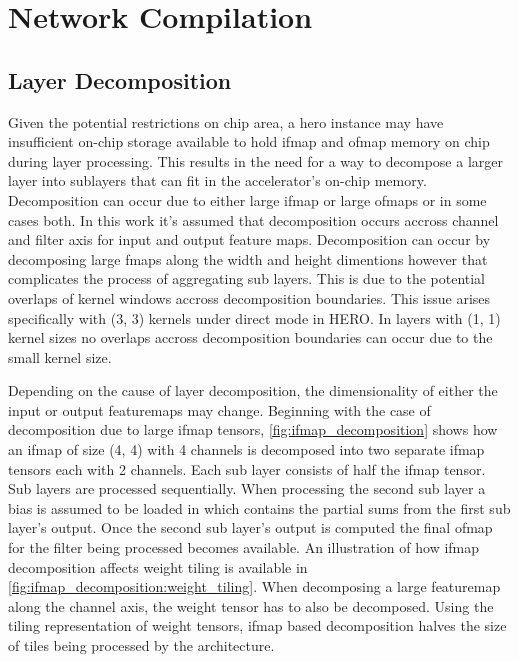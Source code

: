 \chapter{Network Compilation}
\label{chap:net_compile}

\section{Layer Decomposition}
\label{chap:net_compile:layer_decomposition}

Given the potential restrictions on chip area, a hero instance may have
insufficient on-chip storage available to hold ifmap and ofmap memory on chip
during layer processing. This results in the need for a way to decompose a
larger layer into sublayers that can fit in the accelerator's on-chip memory.
Decomposition can occur due to either large ifmap or large ofmaps or in some cases
both. In this work it's assumed that decomposition occurs accross channel and
filter axis for input and output feature maps. Decomposition can occur by
decomposing large fmaps along the width and height dimentions however that
complicates the process of aggregating sub layers. This is due to the potential overlaps
of kernel windows accross decomposition boundaries. This issue arises
specifically with (3, 3) kernels under direct mode in HERO. In layers with (1,
1) kernel sizes no overlaps accross decomposition boundaries can occur due to
the small kernel size. 

Depending on the cause of layer decomposition, the dimensionality of either the
input or output featuremaps may change. Beginning with the case of decomposition due
to large ifmap tensors, \autoref{fig:ifmap_decomposition} shows how an ifmap
of size (4, 4) with 4 channels is decomposed into two separate ifmap tensors
each with 2 channels. Each sub layer consists of half the ifmap tensor. Sub
layers are processed sequentially. When
processing the second sub layer a bias is assumed to be loaded in which contains
the partial sums from the first sub layer's output. Once the second sub layer's
output is computed the final ofmap for the filter being processed becomes
available. An illustration of how ifmap decomposition affects weight tiling is
available in \autoref{fig:ifmap_decomposition:weight_tiling}. When decomposing a
large featuremap along the channel axis, the weight tensor has to also be
decomposed. Using the tiling representation of weight tensors, ifmap based
decomposition halves the size of tiles being processed by the architecture. 


